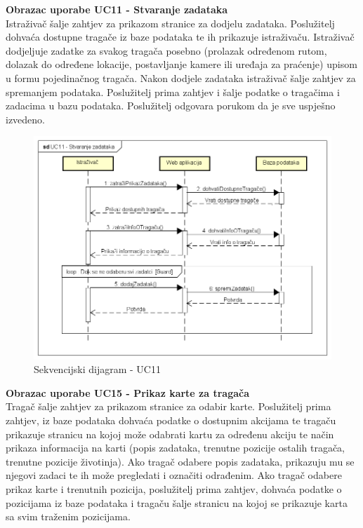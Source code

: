 				\noindent \textbf{Obrazac uporabe UC11 - Stvaranje zadataka}\\
				
				\noindent Istraživač šalje zahtjev za prikazom stranice za dodjelu zadataka. Poslužitelj dohvaća dostupne tragače iz baze podataka te ih prikazuje istraživaču. Istraživač dodjeljuje zadatke za svakog tragača posebno (prolazak određenom rutom, dolazak do određene lokacije, postavljanje kamere ili uređaja za praćenje) upisom u formu pojedinačnog tragača. Nakon dodjele zadataka istraživač šalje zahtjev za spremanjem podataka. Poslužitelj prima zahtjev i šalje podatke o tragačima i zadacima u bazu podataka. Poslužitelj odgovara porukom da je sve uspješno izvedeno.
				
				\begin{figure}[H]
					\includegraphics[scale=0.7]{slike/UC11_sekv.PNG} %
					\centering
					\caption{Sekvencijski dijagram - UC11}
					\label{fig:promjene}
				\end{figure}
				\eject
				
				\noindent \textbf{Obrazac uporabe UC15 - Prikaz karte za tragača}\\
				
				\noindent Tragač šalje zahtjev za prikazom stranice za odabir karte. Poslužitelj prima zahtjev, iz baze podataka dohvaća podatke o dostupnim akcijama te tragaču prikazuje stranicu na kojoj može odabrati kartu za određenu akciju te način prikaza informacija na karti (popis zadataka, trenutne pozicije ostalih tragača, trenutne pozicije životinja). Ako tragač odabere popis zadataka, prikazuju mu se njegovi zadaci te ih može pregledati i označiti odrađenim. Ako tragač odabere prikaz karte i trenutnih pozicija, poslužitelj prima zahtjev, dohvaća podatke o pozicijama iz baze podataka i tragaču šalje stranicu na kojoj se prikazuje karta sa svim traženim pozicijama.
				
